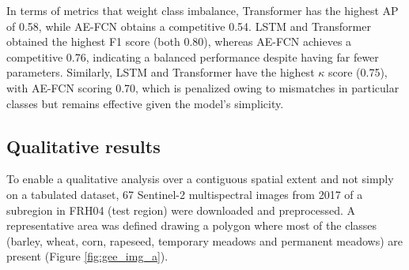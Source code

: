 \documentclass[journal,article,submit,pdftex,moreauthors]{Definitions/mdpi}
\begin{document}
In terms of metrics that weight class imbalance, Transformer has the highest AP of 0.58, while AE-FCN obtains a competitive 0.54. LSTM and Transformer obtained the highest F1 score (both 0.80), whereas AE-FCN achieves a competitive 0.76, indicating a balanced performance despite having far fewer parameters. Similarly, LSTM and Transformer have the highest $\kappa$ score (0.75), with AE-FCN scoring 0.70, which is penalized owing to mismatches in particular classes but remains effective given the model's simplicity.

\subsection{Qualitative results}

To enable a qualitative analysis over a contiguous spatial extent and not simply on a tabulated dataset, 67 Sentinel-2 multispectral images from 2017 of a subregion in FRH04 (test region) were downloaded and preprocessed.
A representative area was defined drawing a polygon where most of the classes (barley, wheat, corn, rapeseed, temporary meadows and permanent meadows) are present (Figure \ref{fig:gee_img_a}). 
\end{document}
